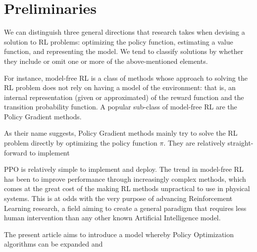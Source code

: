 \section{Preliminaries}

We can distinguish three general directions that research takes when devising a solution to RL problems: optimizing the policy function, estimating a value function, and representing the model. We tend to classify solutions by whether they include or omit one or more of the above-mentioned elements.

For instance, model-free RL is a class of methods whose approach to solving the RL problem does not rely on having a model of the environment: that is, an internal representation (given or approximated) of the reward function and the transition probability function. A popular sub-class of model-free RL are the Policy Gradient methods.

As their name suggests, Policy Gradient methods mainly try to solve the RL problem directly by optimizing the policy function $\pi$. They are relatively straight-forward to implement 


PPO is relatively simple to implement and deploy. The trend in model-free RL has been to improve performance through increasingly complex methods, which comes at the great cost of the making RL methods unpractical to use in physical systems. This is at odds with the very purpose of advancing Reinforcement Learning research, a field aiming to create a general paradigm that requires less human intervention than any other known Artificial Intelligence model.

The present article aims to introduce a model whereby Policy Optimization algorithms can be expanded and 

